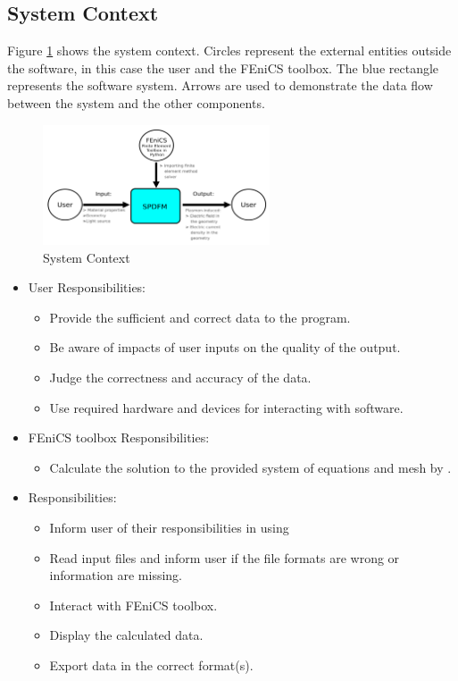 \documentclass[12pt]{article}
\begin{document}
\subsection{System Context}

Figure \ref{Fig_SystemContext} shows the system context. Circles 
represent the external entities outside the software, in this case the user and the FEniCS toolbox. The blue rectangle represents the \progname software system. Arrows are used to demonstrate the data flow between the system and the other components.  
\begin{figure}[h!]
\begin{center}
 \includegraphics[width=0.6\textwidth]{SystemContextFigure.png}
\caption{System Context}
\label{Fig_SystemContext} 
\end{center}
\end{figure}


\begin{itemize}
\item User Responsibilities:
\begin{itemize}
\item Provide the sufficient and correct data to the program.
\item Be aware of impacts of user inputs on the quality of the output.
\item Judge the correctness and accuracy of the data.
\item Use required hardware and devices for interacting with software.
\end{itemize}

\item FEniCS toolbox Responsibilities:
	\begin{itemize}
		\item Calculate the solution to the provided system of equations and mesh by \progname{}.
    \end{itemize}


\item \progname{} Responsibilities:
\begin{itemize} 
\item Inform user of their responsibilities in using \progname{}
\item Read input files and inform user if the file formats are wrong or information are missing. 
\item Interact with FEniCS toolbox. 
\item Display the calculated data.
\item Export data in the correct format(s).
\end{itemize}
\end{itemize}
\end{document}

